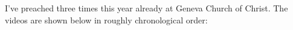 I've preached three times this year already at Geneva Church of Christ.
The videos are shown below in roughly chronological order:
